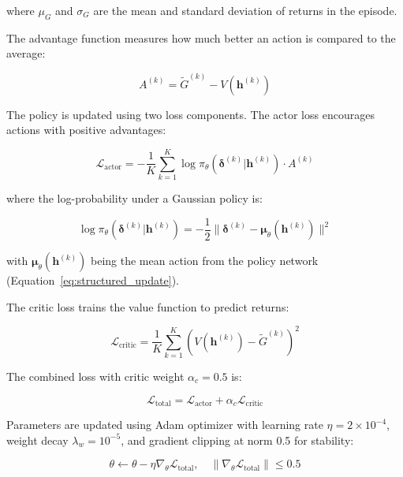 \noindent where $\mu_G$ and $\sigma_G$ are the mean and standard deviation of returns in the episode.

The advantage function measures how much better an action is compared to the average:

\begin{equation}
A^{(k)} = \tilde{G}^{(k)} - V(\mathbf{h}^{(k)})
\label{eq:advantage}
\end{equation}

The policy is updated using two loss components. The actor loss encourages actions with positive advantages:

\begin{equation}
\mathcal{L}_\text{actor} = -\frac{1}{K} \sum_{k=1}^{K} \log \pi_\theta(\boldsymbol{\delta}^{(k)} | \mathbf{h}^{(k)}) \cdot A^{(k)}
\label{eq:actor_loss}
\end{equation}

\noindent where the log-probability under a Gaussian policy is:

\begin{equation}
\log \pi_\theta(\boldsymbol{\delta}^{(k)} | \mathbf{h}^{(k)}) = -\frac{1}{2} \|\boldsymbol{\delta}^{(k)} - \boldsymbol{\mu}_\theta(\mathbf{h}^{(k)})\|^2
\label{eq:log_prob}
\end{equation}

\noindent with $\boldsymbol{\mu}_\theta(\mathbf{h}^{(k)})$ being the mean action from the policy network (Equation~\ref{eq:structured_update}).

The critic loss trains the value function to predict returns:

\begin{equation}
\mathcal{L}_\text{critic} = \frac{1}{K} \sum_{k=1}^{K} (V(\mathbf{h}^{(k)}) - \tilde{G}^{(k)})^2
\label{eq:critic_loss}
\end{equation}

The combined loss with critic weight $\alpha_c = 0.5$ is:

\begin{equation}
\mathcal{L}_\text{total} = \mathcal{L}_\text{actor} + \alpha_c \mathcal{L}_\text{critic}
\label{eq:total_loss}
\end{equation}

Parameters are updated using Adam optimizer with learning rate $\eta = 2 \times 10^{-4}$, weight decay $\lambda_w = 10^{-5}$, and gradient clipping at norm 0.5 for stability:

\begin{equation}
\theta \leftarrow \theta - \eta \nabla_\theta \mathcal{L}_\text{total}, \quad \|\nabla_\theta \mathcal{L}_\text{total}\| \leq 0.5
\label{eq:parameter_update}
\end{equation}


